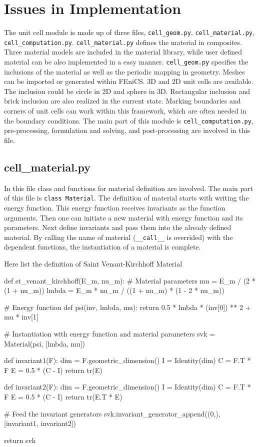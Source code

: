 \documentclass[10pt,a4paper]{scrreprt}
\begin{document}
\section{Issues in Implementation}
The unit cell module is made up of three files, \texttt{cell\_geom.py}, \texttt{cell\_material.py}, \texttt{cell\_computation.py}. \texttt{cell\_material.py} defines the material in composites. Three material models are included in the material library, while user defined material can be also implemented in a easy manner. \texttt{cell\_geom.py} specifies the inclusions of the material as well as the periodic mapping in geometry. Meshes can be imported or generated within FEniCS. 3D and 2D unit cells are available. The inclusion could be circle in 2D and sphere in 3D. Rectangular inclusion and brick inclusion are also realized in the current state. Marking boundaries and corners of unit cells can work within this framework, which are often needed in the boundary conditions. The main part of this module is \texttt{cell\_computation.py}, pre-processing, formulation and solving, and post-processing are involved in this file. 

\subsection{cell\_material.py}
In this file class and functions for material definition are involved. The main part of this file is \texttt{class Material}. The definition of material starts with writing the energy function. This energy function receives invariants as the function arguments. Then one can initiate a new material with energy function and its parameters. Next define invariants and pass them into the already defined material. By calling the name of material (\texttt{\_\_call\_\_} is overrided) with the dependent functions, the instantiation of a material is complete.

Here list the definition of Saint Venant-Kirchhoff Material

\begin{python}
def st_venant_kirchhoff(E_m, nu_m):
	# Material parameters
    mu = E_m / (2 * (1 + nu_m))
    lmbda = E_m * nu_m / ((1 + nu_m) * (1 - 2 * nu_m))

	# Energy function
    def psi(inv, lmbda, mu):
        return 0.5 * lmbda * (inv[0]) ** 2 + mu * inv[1]

	# Instantiation with energy function and material parameters
    svk = Material(psi, [lmbda, mu])

    def invariant1(F):
        dim = F.geometric_dimension()
        I = Identity(dim)
        C = F.T * F
        E = 0.5 * (C - I)
        return tr(E)

    def invariant2(F):
        dim = F.geometric_dimension()
        I = Identity(dim)
        C = F.T * F
        E = 0.5 * (C - I)
        return tr(E.T * E)
	
	# Feed the invariant generators
    svk.invariant_generator_append((0,), [invariant1, invariant2])

    return svk
\end{python}
\end{document}
